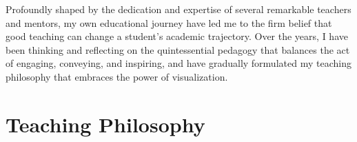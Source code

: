 Profoundly shaped by the dedication and expertise of several remarkable teachers and mentors, my own educational journey have led me to the firm belief that good teaching can change a student's academic trajectory. Over the years, I have been thinking and reflecting on the quintessential pedagogy that balances the act of engaging, conveying, and inspiring, and have gradually formulated my teaching philosophy that embraces the power of visualization.

\section{Teaching Philosophy}


